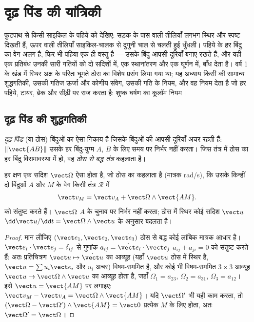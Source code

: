 \chapter{दृढ़ पिंड की यांत्रिकी}\label{ch:b2:rigid-body-mechanics}

फुटपाथ से किसी साइकिल के पहिये को देखिए: सड़क के पास वाली तीलियाँ लगभग
स्थिर और स्पष्ट दिखती हैं, ऊपर वाली तीलियाँ साइकिल-चालक से दुगुनी चाल से
चलती हुई धुँधली। पहिये के हर बिंदु का वेग अलग है, फिर भी पहिया एक ही
वस्तु है --- उसके बिंदु आपसी दूरियाँ बनाए रखते हैं, और यही एक प्रतिबंध
उनकी सारी गतियों को दो सदिशों में, एक स्थानांतरण और एक घूर्णन में, बाँध
देता है। वर्ष 1 के खंड में स्थिर अक्ष के परितः घूमते ठोस का विशेष प्रसंग
लिया गया था; यह अध्याय किसी  की सामान्य शुद्धगतिकी, उसकी गतिज
ऊर्जा और कोणीय संवेग, उसकी गति के नियम, और वह नियम देता है जो हर पहिये,
टायर, ब्रेक और सीढ़ी पर राज करता है: शुष्क घर्षण का कूलॉम नियम।

\section{दृढ़ पिंड की शुद्धगतिकी}

\begin{definition}[दृढ़ पिंड]\label{def:b2:rigid-body-mechanics:solid}
\emph{दृढ़ पिंड} (या ठोस) बिंदुओं का ऐसा निकाय है जिसके बिंदुओं की आपसी
दूरियाँ अचर रहती हैं: $\|\vect{AB}\|$ उसके हर बिंदु-युग्म $A$, $B$ के लिए
समय पर निर्भर नहीं करता। जिस तंत्र में ठोस का हर बिंदु विरामावस्था में
हो, वह \emph{ठोस से बद्ध तंत्र} कहलाता है।
\end{definition}

\begin{theorem}[दृढ़ पिंड का वेग क्षेत्र]\label{thm:b2:rigid-body-mechanics:field}
हर क्षण एक सदिश $\vect\Omega$ ऐसा होता है, जो ठोस का \emph{} कहलाता है (मात्रक \unit{rad/s}), कि उसके किन्हीं दो बिंदुओं
$A$ और $M$ के वेग किसी तंत्र $\mathcal R$ में
\[
\vect v_M = \vect v_A + \vect\Omega\wedge\vect{AM} .
\]
को संतुष्ट करते हैं। $\vect\Omega$ $A$ के चुनाव पर निर्भर नहीं करता; ठोस
में स्थिर कोई सदिश $\vect u$ $\dd\vect u/\dd t = \vect\Omega\wedge\vect u$ के अनुसार बदलता है।
\end{theorem}

\begin{proof}
मान लीजिए $(\vect e_1, \vect e_2, \vect e_3)$ ठोस से बद्ध कोई लांबिक
मात्रक आधार है। $\vect e_i\cdot\vect e_j = \delta_{ij}$ से गुणांक
$a_{ij} = \dot{\vect e}_i\cdot\vect e_j$ $a_{ij} + a_{ji} = 0$ को संतुष्ट करते हैं: अतः
प्रतिचित्रण $\vect u \mapsto \dot{\vect u}$ का आव्यूह (यहाँ $\vect u$ ठोस
में स्थिर है, $\vect u = \sum u_i\vect e_i$ और $u_i$ अचर) विषम-सममित है,
और कोई भी विषम-सममित $3\times3$ आव्यूह
$\vect u \mapsto \vect\Omega\wedge\vect u$ का आव्यूह होता है, जहाँ $\Omega_1 = a_{23}$,
$\Omega_2 = a_{31}$, $\Omega_3 = a_{12}$। इसे $\vect u =
\vect{AM}$ पर लगाइए: $\vect v_M - \vect v_A = \vect\Omega\wedge\vect{AM}$। यदि
$\vect\Omega'$ भी यही काम करता, तो $(\vect\Omega - \vect\Omega')\wedge
\vect{AM} = \vect 0$ प्रत्येक $M$ के लिए होता, अतः $\vect\Omega' = \vect\Omega$।
\end{proof}

